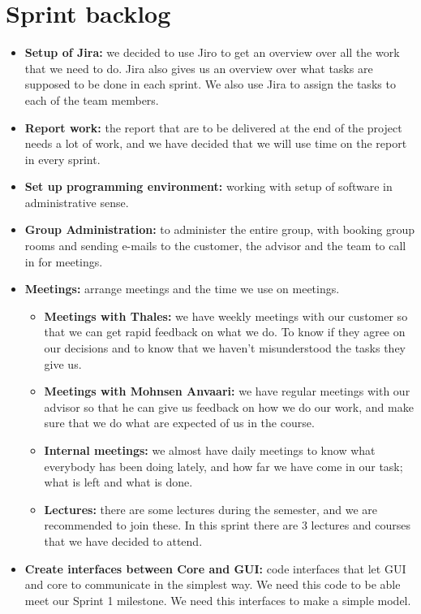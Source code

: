 \section{Sprint backlog}
\begin{itemize}
\item{}\textbf{Setup of Jira:} we decided to use Jiro to get an overview over all the work that we need to do. Jira also gives us an overview over what tasks are supposed to be done in each sprint. We also use Jira to assign the tasks to each of the team members.
\item{}\textbf{Report work:} the report that are to be delivered at the end of the project needs a lot of work, and we have decided that we will use time on the report in every sprint.
\item{}\textbf{Set up programming environment:} working with setup of software in administrative sense.
\item{}\textbf{Group Administration:} to administer the entire group, with booking group rooms and sending e-mails to the customer, the advisor and the team to call in for meetings.
\item{}\textbf{Meetings:} arrange meetings and the time we use on meetings.
\begin{itemize}
\item{}\textbf{Meetings with Thales:} we have weekly meetings with our customer so that we can get rapid feedback on what we do. To know if they agree on our decisions and to know that we haven’t misunderstood the tasks they give us.
\item{}\textbf{Meetings with Mohnsen Anvaari:} we have regular meetings with our advisor so that he can give us feedback on how we do our work, and make sure that we do what are expected of us in the course.
\item{}\textbf{Internal meetings:} we almost have daily meetings to know what everybody has been doing lately, and how far we have come in our task; what is left and what is done.
\item{}\textbf{Lectures:} there are some lectures during the semester, and we are recommended to join these. In this sprint there are 3 lectures and courses that we have decided to attend.
\end{itemize}
\item{}\textbf{Create interfaces between Core and GUI:} code interfaces that let GUI and core to communicate in the simplest way. We need this code to be able meet our Sprint 1 milestone. We need this interfaces to make a simple model.

\end{itemize}
